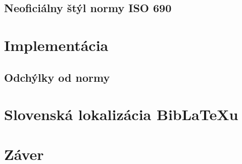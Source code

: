 \documentclass{fithesis3}
\begin{document}
	\section{Neoficiálny štýl normy ISO 690}

\chapter{Implementácia}
	\section{Odchýlky od normy}

\chapter{Slovenská lokalizácia Bib\LaTeX u}

\chapter{Záver}

\printbibliography[heading=bibintoc]
\end{document}
